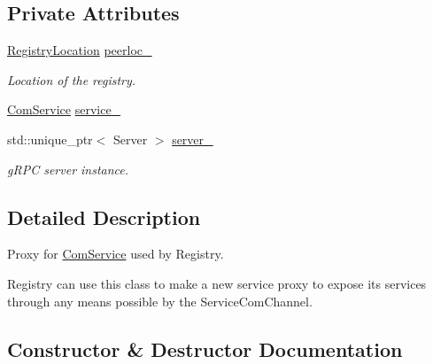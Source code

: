 \subsection*{Private Attributes}
\begin{DoxyCompactItemize}
\item 
\hyperlink{structregistry_1_1RegistryLocation}{Registry\+Location} \hyperlink{classregistry_1_1ServerComChannel_ab5c6072df740f627e9cac01698694aad}{peerloc\+\_\+}
\begin{DoxyCompactList}\small\item\em Location of the registry. \end{DoxyCompactList}\item 
\hyperlink{classregistry_1_1ComService}{Com\+Service} \hyperlink{classregistry_1_1ServerComChannel_a804a3b42c7f7f884dcf97aebeb6757a3}{service\+\_\+}
\item 
std\+::unique\+\_\+ptr$<$ Server $>$ \hyperlink{classregistry_1_1ServerComChannel_acf6c8d32aeeb83d9f775030b70e519d8}{server\+\_\+}
\begin{DoxyCompactList}\small\item\em g\+R\+PC server instance. \end{DoxyCompactList}\end{DoxyCompactItemize}


\subsection{Detailed Description}
Proxy for \hyperlink{classregistry_1_1ComService}{Com\+Service} used by Registry. 

Registry can use this class to make a new service proxy to expose its services through any means possible by the Service\+Com\+Channel. 

\subsection{Constructor \& Destructor Documentation}
\mbox{\label{classregistry_1_1ServerComChannel_aea787386e8aa90a93ff3e833b6f8aeb5}} 
